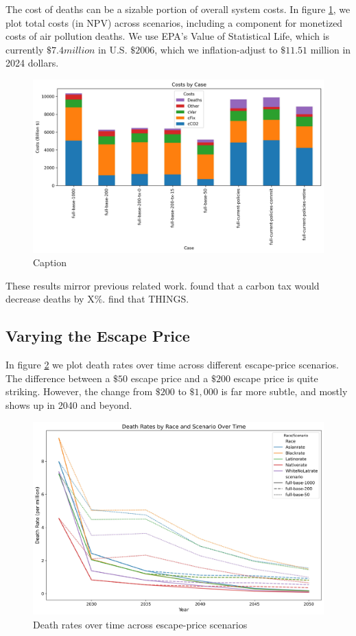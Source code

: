 \documentclass[a4paper]{article}
\theoremstyle{definition}
\theoremstyle{plain}
\begin{document}
The cost of deaths can be a sizable portion of overall system costs.  In figure \ref{CostsBarchart}, we plot total costs (in NPV) across scenarios, including a component for monetized costs of air pollution deaths.  We use EPA's Value of Statistical Life, which is currently $\$7.4 million$ in U.S. $\$ 2006$, which we inflation-adjust to $\$11.51$ million in 2024 dollars.

\begin{figure}
    \centering
    \includegraphics[width=0.5\linewidth]{Figures/Output/Costs_Barchart_GenX.png}
    \caption{Caption}
    \label{CostsBarchart}
\end{figure}

These results mirror previous related work.  \citet{Shawhan2024PoliciesAmericans} found that a carbon tax would decrease deaths by X$\%$.  \citet{Goforth2022AirStrategies} find that THINGS.

\subsection{Varying the Escape Price}
In figure \ref{EscapePrice} we plot death rates over time across different escape-price scenarios.  The difference between a $\$50$ escape price and a $\$200$ escape price is quite striking.  However, the change from $\$200$ to $\$1,000$ is far more subtle, and mostly shows up in 2040 and beyond.

\begin{figure}
    \centering
    \includegraphics[width=1\linewidth]{Figures/Output/Compare_scenarios_compare-escape-price_GenX.jpg}
    \caption{Death rates over time across escape-price scenarios}
    \label{EscapePrice}
\end{figure}
\end{document}
